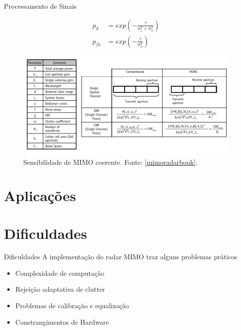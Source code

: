 \documentclass[portuguese]{beamer}
\begin{document}
\begin{frame}{Processamento de Sinais}
  \par
  \small
  \begin{align*}
    p_d &= exp\left( -\frac{\gamma}{\sigma_t^2 + \sigma_n^2} \right)  \\
    p_{fa} &= exp\left( -\frac{\gamma}{\sigma_n^2} \right) 
  \end{align*}
  \begin{figure}[]
	\centering
	\includegraphics[width=0.9\linewidth]{../report/graphics/table.png}
	\caption{Sensibilidade de MIMO coerente. Fonte: \ref{mimoradarbook}.}
	\label{fig:tabela}
  \end{figure}
\end{frame}

\section{Aplicações}

\section{Dificuldades}

\begin{frame}{Dificuldades}
  A implementação do radar MIMO traz alguns problemas práticos
  \vspace{10pt}
  \begin{itemize}
    \item Complexidade de computação
	\item Rejeição adaptativa de clutter
	\item Problemas de calibração e equalização
	\item Constrangimentos de Hardware
  \end{itemize}
\end{frame}
\end{document}
